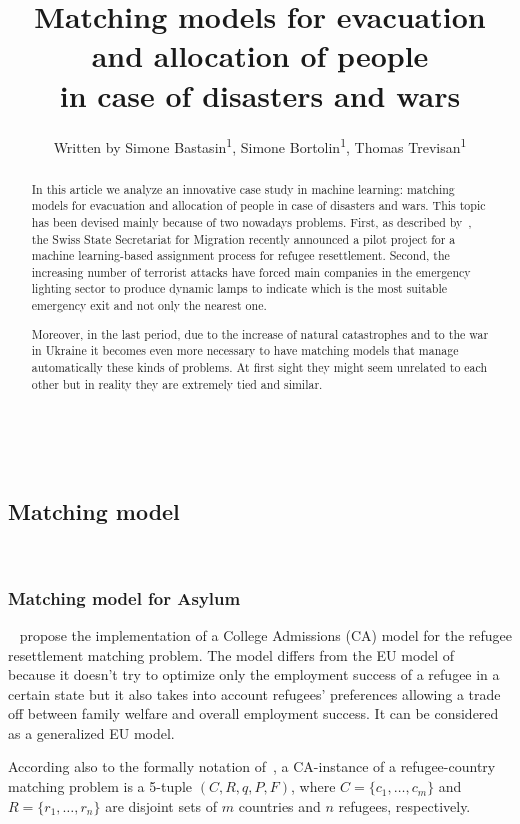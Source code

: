 \documentclass[letterpaper]{article} %
\title{Matching models for evacuation and allocation of people\\in case of disasters and wars}
\author{
    Written by Simone Bastasin\textsuperscript{\rm 1}, Simone Bortolin\textsuperscript{\rm 1}, Thomas Trevisan\textsuperscript{\rm 1}
    \\
}
\begin{document}
    \maketitle

    \begin{abstract}
        In this article we analyze an innovative case study in machine learning: matching models for evacuation and allocation of people in case of disasters and wars. This topic has been devised mainly because of two nowadays problems. First, as described by~\citet{olbergml}, the Swiss State Secretariat for Migration recently announced a pilot project for a machine learning-based assignment process for refugee resettlement. Second, the increasing number of terrorist attacks have forced main companies in the emergency lighting sector to produce dynamic lamps to indicate which is the most suitable emergency exit and not only the nearest one.

        Moreover, in the last period, due to the increase of natural catastrophes and to the war in Ukraine it becomes even more necessary to have matching models that manage automatically  these kinds of problems. At first sight they might seem unrelated to each other but in reality they are extremely tied and similar.
    \end{abstract}

    \noindent%
    ~\citet{olbergml,basshuysen,delacretaz_2020,andersson}

    \subsection{Matching model}\label{matching-model}%
    ~\citet{olbergml,basshuysen,delacretaz_2020}

    \subsubsection{Matching model for Asylum}\label{matching-model-for-asylum}%
    ~\citet{olbergml,basshuysen,delacretaz_2020,fernandez} propose the implementation of a College Admissions (CA) model for the refugee resettlement matching problem.
    The model differs from the EU model of~\citet{basshuysen} because it doesn't try to optimize only the employment success of a refugee in a certain state but it also takes into account refugees' preferences allowing a trade off between family welfare and overall employment success.
    It can be considered as a generalized EU model.

    According also to the formally notation of~\citet{salles}, a CA-instance of a refugee-country matching problem is a 5-tuple $(C, R, q, P, F)$, where $C = \{c_1, \dots, c_m\}$ and $R = \{r_1, \dots, r_n\}$ are disjoint sets of $m$ countries and $n$ refugees, respectively.
\end{document}
